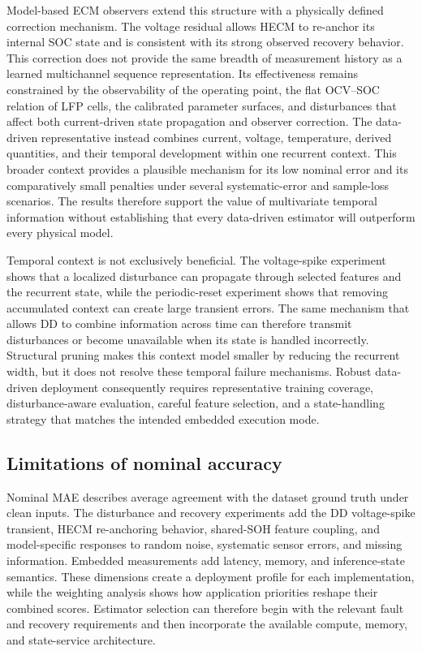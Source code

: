 \documentclass[review,nopreprintline]{elsarticle}
\begin{document}
Model-based ECM observers extend this structure with a physically defined correction mechanism. The voltage residual allows HECM to re-anchor its internal SOC state and is consistent with its strong observed recovery behavior. This correction does not provide the same breadth of measurement history as a learned multichannel sequence representation. Its effectiveness remains constrained by the observability of the operating point, the flat OCV--SOC relation of LFP cells, the calibrated parameter surfaces, and disturbances that affect both current-driven state propagation and observer correction. The data-driven representative instead combines current, voltage, temperature, derived quantities, and their temporal development within one recurrent context. This broader context provides a plausible mechanism for its low nominal error and its comparatively small penalties under several systematic-error and sample-loss scenarios. The results therefore support the value of multivariate temporal information without establishing that every data-driven estimator will outperform every physical model.

Temporal context is not exclusively beneficial. The voltage-spike experiment shows that a localized disturbance can propagate through selected features and the recurrent state, while the periodic-reset experiment shows that removing accumulated context can create large transient errors. The same mechanism that allows DD to combine information across time can therefore transmit disturbances or become unavailable when its state is handled incorrectly. Structural pruning makes this context model smaller by reducing the recurrent width, but it does not resolve these temporal failure mechanisms. Robust data-driven deployment consequently requires representative training coverage, disturbance-aware evaluation, careful feature selection, and a state-handling strategy that matches the intended embedded execution mode.

\subsection{Limitations of nominal accuracy}
Nominal MAE describes average agreement with the dataset ground truth under clean inputs. The disturbance and recovery experiments add the DD voltage-spike transient, HECM re-anchoring behavior, shared-SOH feature coupling, and model-specific responses to random noise, systematic sensor errors, and missing information. Embedded measurements add latency, memory, and inference-state semantics. These dimensions create a deployment profile for each implementation, while the weighting analysis shows how application priorities reshape their combined scores. Estimator selection can therefore begin with the relevant fault and recovery requirements and then incorporate the available compute, memory, and state-service architecture.
\end{document}
